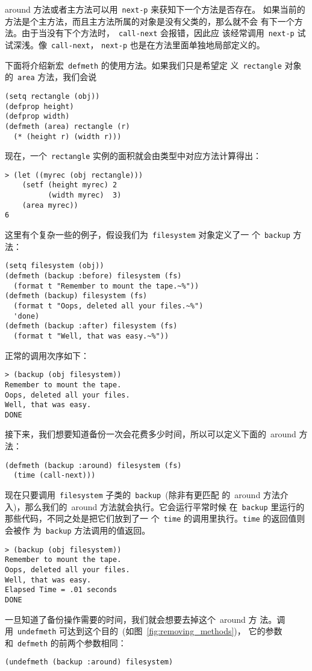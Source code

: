 around 方法或者主方法可以用~\texttt{next-p} 来获知下一个方法是否存在。
如果当前的方法是个主方法，而且主方法所属的对象是没有父类的，那么就不会
有下一个方法。由于当没有下个方法时，~\texttt{call-next} 会报错，因此应
该经常调用~\texttt{next-p} 试试深浅。像~\texttt{call-next}，
\texttt{next-p} 也是在方法里面单独地局部定义的。

下面将介绍新宏~\texttt{defmeth} 的使用方法。如果我们只是希望定
义~\texttt{rectangle} 对象的~\texttt{area} 方法，我们会说
\begin{lstlisting}
(setq rectangle (obj))
(defprop height)
(defprop width)
(defmeth (area) rectangle (r)
  (* (height r) (width r)))
\end{lstlisting}

现在，一个~\texttt{rectangle} 实例的面积就会由类型中对应方法计算得出：
\begin{lstlisting}
> (let ((myrec (obj rectangle)))
    (setf (height myrec) 2
          (width myrec)  3)
    (area myrec))
6
\end{lstlisting}
这里有个复杂一些的例子，假设我们为~\texttt{filesystem} 对象定义了一
个~\texttt{backup} 方法：
\begin{lstlisting}
(setq filesystem (obj))
(defmeth (backup :before) filesystem (fs)
  (format t "Remember to mount the tape.~%"))
(defmeth (backup) filesystem (fs)
  (format t "Oops, deleted all your files.~%")
  'done)
(defmeth (backup :after) filesystem (fs)
  (format t "Well, that was easy.~%"))
\end{lstlisting}
正常的调用次序如下：
\begin{lstlisting}
> (backup (obj filesystem))
Remember to mount the tape.
Oops, deleted all your files.
Well, that was easy.
DONE
\end{lstlisting}
接下来，我们想要知道备份一次会花费多少时间，所以可以定义下面的~around 方
法：
\begin{lstlisting}
(defmeth (backup :around) filesystem (fs)
  (time (call-next)))
\end{lstlisting}
现在只要调用~\texttt{filesystem} 子类的~\texttt{backup}~(除非有更匹配
的~around 方法介入)，那么我们的~around 方法就会执行。它会运行平常时候
在~\texttt{backup} 里运行的那些代码，不同之处是把它们放到了一
个~\texttt{time} 的调用里执行。\texttt{time} 的返回值则会被作
为~\texttt{backup} 方法调用的值返回。
\begin{lstlisting}
> (backup (obj filesystem))
Remember to mount the tape.
Oops, deleted all your files.
Well, that was easy.
Elapsed Time = .01 seconds
DONE
\end{lstlisting}
一旦知道了备份操作需要的时间，我们就会想要去掉这个~around 方
法。调用~\texttt{undefmeth} 可达到这个目的~(如图~\ref{fig:removing_methods})，
它的参数和~\texttt{defmeth} 的前两个参数相同：
\begin{lstlisting}
(undefmeth (backup :around) filesystem)
\end{lstlisting}


